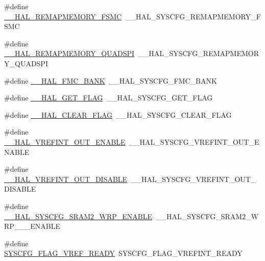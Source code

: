 \begin{DoxyCompactItemize}
\item 
\#define \hyperlink{group___h_a_l___aliased___macros_gace8e26327633559ff2a31f3abfb0b43b}{\+\_\+\+\_\+\+H\+A\+L\+\_\+\+R\+E\+M\+A\+P\+M\+E\+M\+O\+R\+Y\+\_\+\+F\+S\+MC}~\+\_\+\+\_\+\+H\+A\+L\+\_\+\+S\+Y\+S\+C\+F\+G\+\_\+\+R\+E\+M\+A\+P\+M\+E\+M\+O\+R\+Y\+\_\+\+F\+S\+MC
\item 
\#define \hyperlink{group___h_a_l___aliased___macros_gabec43ae4c792da49cd660bba7bf21133}{\+\_\+\+\_\+\+H\+A\+L\+\_\+\+R\+E\+M\+A\+P\+M\+E\+M\+O\+R\+Y\+\_\+\+Q\+U\+A\+D\+S\+PI}~\+\_\+\+\_\+\+H\+A\+L\+\_\+\+S\+Y\+S\+C\+F\+G\+\_\+\+R\+E\+M\+A\+P\+M\+E\+M\+O\+R\+Y\+\_\+\+Q\+U\+A\+D\+S\+PI
\item 
\#define \hyperlink{group___h_a_l___aliased___macros_ga998ba343dd714de7bc84010ef1af5f89}{\+\_\+\+\_\+\+H\+A\+L\+\_\+\+F\+M\+C\+\_\+\+B\+A\+NK}~\+\_\+\+\_\+\+H\+A\+L\+\_\+\+S\+Y\+S\+C\+F\+G\+\_\+\+F\+M\+C\+\_\+\+B\+A\+NK
\item 
\#define \hyperlink{group___h_a_l___aliased___macros_gabf8f11b57435bd1462f9a2137653c787}{\+\_\+\+\_\+\+H\+A\+L\+\_\+\+G\+E\+T\+\_\+\+F\+L\+AG}~\+\_\+\+\_\+\+H\+A\+L\+\_\+\+S\+Y\+S\+C\+F\+G\+\_\+\+G\+E\+T\+\_\+\+F\+L\+AG
\item 
\#define \hyperlink{group___h_a_l___aliased___macros_ga5c6118ac714daf269dfcf8b0dc5740cf}{\+\_\+\+\_\+\+H\+A\+L\+\_\+\+C\+L\+E\+A\+R\+\_\+\+F\+L\+AG}~\+\_\+\+\_\+\+H\+A\+L\+\_\+\+S\+Y\+S\+C\+F\+G\+\_\+\+C\+L\+E\+A\+R\+\_\+\+F\+L\+AG
\item 
\#define \hyperlink{group___h_a_l___aliased___macros_gac1dfd2bab2879b5106f1dc496e3c356c}{\+\_\+\+\_\+\+H\+A\+L\+\_\+\+V\+R\+E\+F\+I\+N\+T\+\_\+\+O\+U\+T\+\_\+\+E\+N\+A\+B\+LE}~\+\_\+\+\_\+\+H\+A\+L\+\_\+\+S\+Y\+S\+C\+F\+G\+\_\+\+V\+R\+E\+F\+I\+N\+T\+\_\+\+O\+U\+T\+\_\+\+E\+N\+A\+B\+LE
\item 
\#define \hyperlink{group___h_a_l___aliased___macros_ga8ef2904e9bea234864ed664771aeed49}{\+\_\+\+\_\+\+H\+A\+L\+\_\+\+V\+R\+E\+F\+I\+N\+T\+\_\+\+O\+U\+T\+\_\+\+D\+I\+S\+A\+B\+LE}~\+\_\+\+\_\+\+H\+A\+L\+\_\+\+S\+Y\+S\+C\+F\+G\+\_\+\+V\+R\+E\+F\+I\+N\+T\+\_\+\+O\+U\+T\+\_\+\+D\+I\+S\+A\+B\+LE
\item 
\#define \hyperlink{group___h_a_l___aliased___macros_gacc4f47478d9502c7f9326378ddf68967}{\+\_\+\+\_\+\+H\+A\+L\+\_\+\+S\+Y\+S\+C\+F\+G\+\_\+\+S\+R\+A\+M2\+\_\+\+W\+R\+P\+\_\+\+E\+N\+A\+B\+LE}~\+\_\+\+\_\+\+H\+A\+L\+\_\+\+S\+Y\+S\+C\+F\+G\+\_\+\+S\+R\+A\+M2\+\_\+\+W\+R\+P\+\_\+\_\+\_\+\+E\+N\+A\+B\+LE
\item 
\#define \hyperlink{group___h_a_l___aliased___macros_ga2978f132138676255e533e6f18fbe5df}{S\+Y\+S\+C\+F\+G\+\_\+\+F\+L\+A\+G\+\_\+\+V\+R\+E\+F\+\_\+\+R\+E\+A\+DY}~S\+Y\+S\+C\+F\+G\+\_\+\+F\+L\+A\+G\+\_\+\+V\+R\+E\+F\+I\+N\+T\+\_\+\+R\+E\+A\+DY

\end{DoxyCompactItemize}
